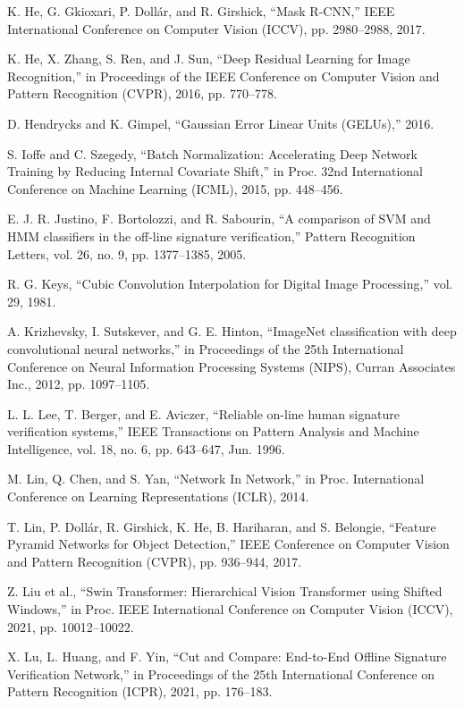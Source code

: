 \begin{thebibliography}{10}
K. He, G. Gkioxari, P. Dollár, and R. Girshick, ``Mask R-CNN,'' IEEE International Conference on Computer Vision (ICCV), pp. 2980--2988,
2017.

K. He, X. Zhang, S. Ren, and J. Sun, ``Deep Residual Learning for Image Recognition,'' in Proceedings of the IEEE Conference on Computer Vision and Pattern Recognition (CVPR),
2016, pp. 770--778.

D. Hendrycks and K. Gimpel, ``Gaussian Error Linear Units (GELUs),''
2016.

S. Ioffe and C. Szegedy, ``Batch Normalization: Accelerating Deep Network Training by Reducing Internal Covariate Shift,'' in Proc. 32nd International Conference on Machine Learning (ICML),
2015, pp. 448--456.

E. J. R. Justino, F. Bortolozzi, and R. Sabourin, ``A comparison of SVM and HMM classifiers in the off-line signature verification,'' Pattern Recognition Letters, vol. 26, no. 9, pp. 1377--1385,
2005.

R. G. Keys, ``Cubic Convolution Interpolation for Digital Image Processing,'' vol. 29,
1981.

A. Krizhevsky, I. Sutskever, and G. E. Hinton, ``ImageNet classification with deep convolutional neural networks,'' in Proceedings of the 25th International Conference on Neural Information Processing Systems (NIPS), Curran Associates Inc.,
2012, pp. 1097--1105.

L. L. Lee, T. Berger, and E. Aviczer, ``Reliable on-line human signature verification systems,'' IEEE Transactions on Pattern Analysis and Machine Intelligence, vol. 18, no. 6, pp. 643--647,
Jun. 1996.

M. Lin, Q. Chen, and S. Yan, ``Network In Network,'' in Proc. International Conference on Learning Representations (ICLR),
2014.

T. Lin, P. Dollár, R. Girshick, K. He, B. Hariharan, and S. Belongie, ``Feature Pyramid Networks for Object Detection,'' IEEE Conference on Computer Vision and Pattern Recognition (CVPR), pp. 936--944,
2017.

Z. Liu et al., ``Swin Transformer: Hierarchical Vision Transformer using Shifted Windows,'' in Proc. IEEE International Conference on Computer Vision (ICCV),
2021, pp. 10012--10022.

X. Lu, L. Huang, and F. Yin, ``Cut and Compare: End-to-End Offline Signature Verification Network,'' in Proceedings of the 25th International Conference on Pattern Recognition (ICPR),
2021, pp. 176--183.


\end{thebibliography}
